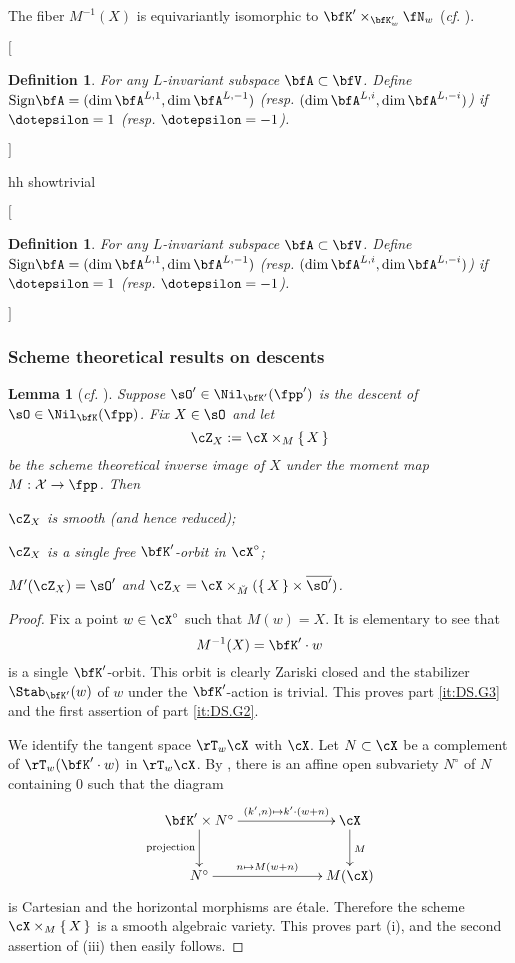 \documentclass[12pt,a4paper]{amsart}
\makeatletter
\newcommand*{\circnuma}[1]{%
  \ifnum#1<1 %
    \@ctrerr
  \else
    \ifnum#1>20 %
      \@ctrerr
    \else
      \mbox{\ding{\numexpr 171+(#1)\relax}}%
     \fi
  \fi
}
\newcommand{\trivial}[2][]{\if\relax\detokenize{#1}\relax
  {%
      \color{orange} \vspace{0em} $[$  #2 $]$
      \color{black}
  }
  \else
\ifx#1h
\ifcsname showtrivial\endcsname
{%
    \color{orange} \vspace{0em}  $[$ #2 $]$
    \color{black}
}
\fi
\else {\red Wrong argument!} \fi
\fi
}
\newcommand{\CX}{{\mathcal {X}}}
\numberwithin{equation}{section}
\newtheorem{lem}[thm]{Lemma}
\newtheorem{defn}[thm]{Definition}
\theoremstyle{remark}
\def\MMP{M}
\def\Xo{\cX^\circ}
\def\ssign{\mathrm{Sign}}
\def\ZX{\cZ_{X}}
\def\bsOp{\overline{\sO'}}
\def\cf{\emph{cf.} }
\makeatother
\begin{document}
{  The fiber $M^{-1}(X)$ is equivariantly isomorphic to
  $\bfK'\times_{\bfK'_w}\fN_w$ (\emph{cf}.  \cite[Theorem~6.6]{PV}).


\trivial[h]{
  \medskip


\begin{defn}
  For any $L$-invariant subspace $\bfA \subset \bfV$.  Define
  $\ssign\bfA = (\dim \bfA^{L,1}, \dim \bfA^{L,-1})$ (resp.
$(\dim \bfA^{L,i}, \dim \bfA^{L,-i})$) if $\dotepsilon=1$ (resp.
$\dotepsilon = -1$).
\end{defn}
}
}


\subsubsection{Scheme theoretical results on descents}\label{sec:Sdes}


\begin{lem}[{\cf \cite[Lemma~13 and Lemma 14]{Ohta}}]\label{lem:DS.sh}
Suppose $\sO'\in \Nil_{\bfK'}(\fpp')$ is the descent of $\sO\in \Nil_\bfK(\fpp)$.
Fix $X\in \sO$ and
let
\[
\ZX := \cX\times_{M}\set{X}
\]
be the scheme theoretical
inverse image of $X$ under the moment map $M: \CX\rightarrow \fpp$. Then
\begin{enumT}
\item\label{it:DS.G1} $\ZX$ is smooth (and hence reduced);
\item\label{it:DS.G3}   $\ZX$ is
  a single free $\bfK'$-orbit in $\Xo$;
\item\label{it:DS.G2}$M'(\ZX) = \sO'$ and $\ZX = \cX\times_{\dbM}( \set{X} \times\bsOp)$.
\end{enumT}
\end{lem}
 \begin{proof}
  Fix a point  $w\in \cX^\circ$ such that $M(w)=X$. It is elementary to see that
  \[
  M^{-1}(X)=\bfK'\cdot w
  \]
  is a single $\bfK'$-orbit. This orbit is clearly Zariski closed and the
  stabilizer $\Stab_{\bfK'}(w)$ of $w$ under the $\bfK'$-action is trivial. This
  proves part \cref{it:DS.G3} and the first assertion of part \cref{it:DS.G2}.

  We identify the tangent space $\rT_w\cX$ with $\cX$.  Let $N\subset \cX$
be a complement of $\rT_w (\bfK'\cdot w)$ in $\rT_w \cX$.
By \cite[Section~6.3]{PV}, there is an affine open subvariety $N^\circ$ of $N$ containing $0$ such that  the diagram
\[%
    \xymatrix@C=6em{
      \bfK' \times N^\circ \ar[r]^<>(.5){(k',n)\mapsto k'\cdot (w+n)} \ar[d]_<>(.5){\text{projection}}& \cX \ar[d]^{\MMP}\\
    N^\circ \ar[r]^<>(.5){n\mapsto M(w+n)}&  \MMP(\cX)
     }
\]
is  Cartesian and the
horizontal morphisms are \'etale. Therefore the scheme $\cX\times_M\set{X}$ is a smooth algebraic variety. This proves part (i), and the second assertion of (iii) then easily follows.
\end{proof}
\end{document}
